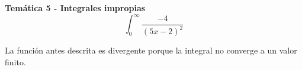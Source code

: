 \textbf{Temática 5 - Integrales impropias}
\[\int_{0}^{\infty}\frac{-4}{(5x-2)^2}\]

La función antes descrita es divergente porque la integral no converge a un valor finito.